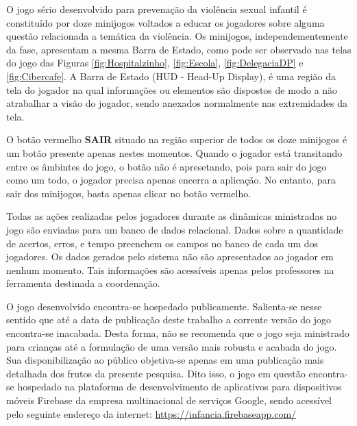 O jogo sério desenvolvido para prevenação da violência sexual infantil é constituído por doze minijogos voltados a educar os jogadores sobre alguma questão relacionada a temática da violência. Os minijogos, independementemente da fase, apresentam a mesma Barra de Estado, como pode ser observado nas telas do jogo das Figuras \ref{fig:Hospitalzinho}, \ref{fig:Escola}, \ref{fig:DelegaciaDP} e \ref{fig:Cibercafe}. A Barra de Estado (HUD - Head-Up Display), é uma região da tela do jogador na qual informações ou elementos são dispostos de modo a não atrabalhar a visão do jogador, sendo anexados normalmente nas extremidades da tela. 

O botão vermelho \textbf{SAIR} situado na região superior de todos os doze minijogos é um botão presente apenas nestes momentos. Quando o jogador está transitando entre os âmbintes do jogo, o botão não é apresetando, pois para sair do jogo como um todo, o jogador precisa apenas encerra a aplicação. No entanto, para sair dos minijogos, basta apenas clicar no botão vermelho.

Todas as ações realizadas pelos jogadores durante as dinâmicas ministradas no jogo são enviadas para um banco de dados relacional. Dados sobre a quantidade de acertos, erros, e tempo preenchem os campos no banco de cada um dos jogadores. Os dados gerados pelo sistema não são apresentados ao jogador em nenhum momento. Tais informações são acessíveis apenas pelos professores na ferramenta destinada a coordenação.

O jogo desenvolvido encontra-se hospedado publicamente. Salienta-se nesse sentido que até a data de publicação deste trabalho a corrente versão do jogo encontra-se inacabada. Desta forma, não se recomenda que o jogo seja ministrado para crianças até a formulação de uma versão mais robusta e acabada do jogo. Sua disponibilização ao público objetiva-se apenas em uma publicação mais detalhada dos frutos da presente pesquisa. Dito isso, o jogo em questão encontra-se hospedado na plataforma de desenvolvimento de aplicativos para dispositivos móveis Firebase da empresa multinacional de serviços Google, sendo acessível pelo seguinte endereço da internet: \url{https://infancia.firebaseapp.com/}








